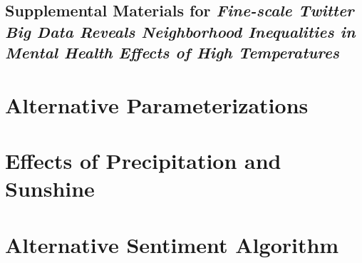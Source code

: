 \documentclass{article}
\begin{document}
\begin{center}
\section*{Supplemental Materials for \textit{Fine-scale Twitter Big Data Reveals Neighborhood Inequalities in Mental Health Effects of High Temperatures}}
\end{center}



\section{Alternative Parameterizations}

\section{Effects of Precipitation and Sunshine}

\section{Alternative Sentiment Algorithm}

\setcounter{table}{0}
\setcounter{figure}{0}
\setcounter{section}{0}
\renewcommand{\thetable}{S\arabic{table}}
\renewcommand{\thefigure}{S\arabic{figure}}
\renewcommand{\thesection}{S\arabic{section}}

\printbibliography
\end{document}
